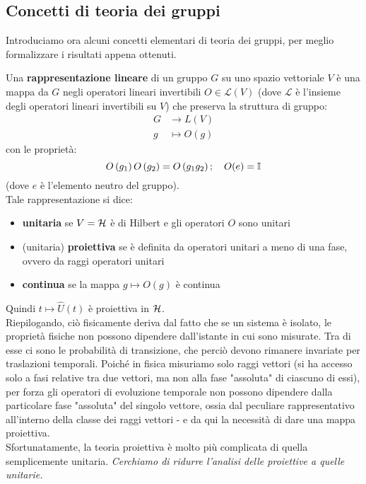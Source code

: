 \documentclass[../../FisicaTeorica.tex]{subfiles}
\begin{document}
\subsection{Concetti di teoria dei gruppi}
Introduciamo ora alcuni concetti elementari di teoria dei gruppi, per meglio formalizzare i risultati appena ottenuti. 
\begin{dfn}
Una \textbf{rappresentazione lineare} di un gruppo $G$ su uno spazio vettoriale $V$ è una mappa da $G$ negli operatori lineari invertibili $O\in \mathcal{L}(V)$ (dove $\mathcal{L}$ è l'insieme degli operatori lineari invertibili su $V$) che preserva la struttura di gruppo:
\begin{align*}
    G&\to L\left(V\right)\\
g&\mapsto O\left(g\right)
\end{align*}
con le proprietà:
\[
O\left(g_1\right)O\left(g_2\right)=O\left(g_1g_2\right); \quad O(e) = \mathbb{I}
\]
(dove $e$ è l'elemento neutro del gruppo).\\
Tale rappresentazione si dice:
\begin{itemize}
    \item \textbf{unitaria} se $V=\mathcal{H}$ è di Hilbert e gli operatori $O$ sono unitari
    \item (unitaria) \textbf{proiettiva} se è definita da operatori unitari a meno di una fase, ovvero da raggi operatori unitari
    \item \textbf{continua} se la mappa $g\mapsto O(g)$ è continua
\end{itemize}
\end{dfn}
Quindi $t\mapsto \hat{U}(t)$ è proiettiva in $\mathcal{H}$.\\
Riepilogando, ciò fisicamente deriva dal fatto che se un sistema è isolato, le proprietà fisiche non possono dipendere dall'istante in cui sono misurate. Tra di esse ci sono le probabilità di transizione, che perciò devono rimanere invariate per traslazioni temporali. Poiché in fisica misuriamo solo raggi vettori (si ha accesso solo a fasi relative tra due vettori, ma non alla fase "assoluta" di ciascuno di essi), per forza gli operatori di evoluzione temporale non possono dipendere dalla particolare fase "assoluta" del singolo vettore, ossia dal peculiare rappresentativo all'interno della classe dei raggi vettori - e da qui la necessità di dare una mappa proiettiva.\\
Sfortunatamente, la teoria proiettiva è molto più complicata di quella semplicemente unitaria.
\textit{Cerchiamo di ridurre l'analisi delle proiettive a quelle unitarie.}\\
\end{document}
